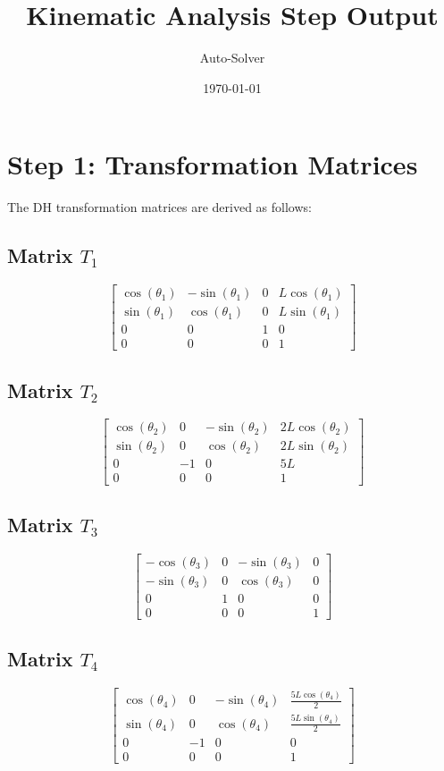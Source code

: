 \documentclass[12pt, a4paper]{article}
\title{\textbf{Kinematic Analysis Step Output}}
\author{Auto-Solver}
\date{\today}
\begin{document}
\maketitle
\tableofcontents
\newpage
\section{Step 1: Transformation Matrices}
The DH transformation matrices are derived as follows:
\subsection*{Matrix $T_{1}$}
\[ \left[\begin{matrix}\cos{\left(\theta_{1} \right)} & - \sin{\left(\theta_{1} \right)} & 0 & L \cos{\left(\theta_{1} \right)}\\\sin{\left(\theta_{1} \right)} & \cos{\left(\theta_{1} \right)} & 0 & L \sin{\left(\theta_{1} \right)}\\0 & 0 & 1 & 0\\0 & 0 & 0 & 1\end{matrix}\right] \]
\subsection*{Matrix $T_{2}$}
\[ \left[\begin{matrix}\cos{\left(\theta_{2} \right)} & 0 & - \sin{\left(\theta_{2} \right)} & 2 L \cos{\left(\theta_{2} \right)}\\\sin{\left(\theta_{2} \right)} & 0 & \cos{\left(\theta_{2} \right)} & 2 L \sin{\left(\theta_{2} \right)}\\0 & -1 & 0 & 5 L\\0 & 0 & 0 & 1\end{matrix}\right] \]
\subsection*{Matrix $T_{3}$}
\[ \left[\begin{matrix}- \cos{\left(\theta_{3} \right)} & 0 & - \sin{\left(\theta_{3} \right)} & 0\\- \sin{\left(\theta_{3} \right)} & 0 & \cos{\left(\theta_{3} \right)} & 0\\0 & 1 & 0 & 0\\0 & 0 & 0 & 1\end{matrix}\right] \]
\subsection*{Matrix $T_{4}$}
\[ \left[\begin{matrix}\cos{\left(\theta_{4} \right)} & 0 & - \sin{\left(\theta_{4} \right)} & \frac{5 L \cos{\left(\theta_{4} \right)}}{2}\\\sin{\left(\theta_{4} \right)} & 0 & \cos{\left(\theta_{4} \right)} & \frac{5 L \sin{\left(\theta_{4} \right)}}{2}\\0 & -1 & 0 & 0\\0 & 0 & 0 & 1\end{matrix}\right] \]
\end{document}
